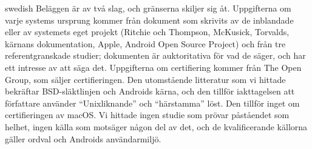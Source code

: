 \begin{onlyin}{swedish}
Beläggen är av två slag, och gränserna skiljer sig åt.
Uppgifterna om varje systems ursprung kommer från dokument som skrivits
av de inblandade eller av systemets eget projekt (Ritchie och Thompson,
McKusick, Torvalds, kärnans dokumentation, Apple, Android Open Source
Project) och från tre referentgranskade studier; dokumenten är
auktoritativa för vad de säger, och har ett intresse av att säga det.
Uppgifterna om certifiering kommer från The Open Group, som säljer
certifieringen.
Den utomstående litteratur som vi hittade bekräftar BSD-släktlinjen och
Androids kärna, och den tillför iakttagelsen att författare använder
\enquote{Unixliknande} och \enquote{härstamma} löst.
Den tillför inget om certifieringen av macOS.
Vi hittade ingen studie som prövar påståendet som helhet, ingen källa som
motsäger någon del av det, och de kvalificerande källorna gäller
ordval och Androids användarmiljö.


\end{onlyin}
